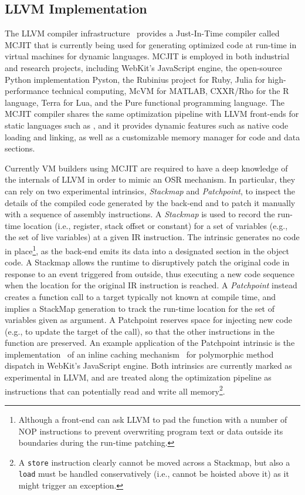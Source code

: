 \subsection{LLVM Implementation}
\label{ss:osrkit-implementation}

The LLVM compiler infrastructure~\cite{Lattner04} provides a Just-In-Time compiler called MCJIT that is currently being used for generating optimized code at run-time in virtual machines for dynamic languages. MCJIT is employed in both industrial and research projects, including WebKit's JavaScript engine, the open-source Python implementation Pyston, the Rubinius project for Ruby, Julia for high-performance technical computing, McVM for MATLAB, CXXR/Rho for the R language, Terra for Lua, and the Pure functional programming language. The MCJIT compiler shares the same optimization pipeline with LLVM front-ends for static languages such as \clang, and it provides dynamic features such as native code loading and linking, as well as a customizable memory manager for code and data sections.

Currently VM builders using MCJIT are required to have a deep knowledge of the internals of LLVM in order to mimic an OSR mechanism. In particular, they can rely on two experimental intrinsics, {\em Stackmap} and {\em Patchpoint}, to inspect the details of the compiled code generated by the back-end and to patch it manually with a sequence of assembly instructions. A {\em Stackmap} is used to record the run-time location (i.e., register, stack offset or constant) for a set of variables (e.g., the set of live variables) at a given IR instruction. The intrinsic generates no code in place\footnote{Although a front-end can ask LLVM to pad the function with a number of NOP instructions to prevent overwriting program text or data outside its boundaries during the run-time patching.}, as the back-end emits its data into a designated section in the object code. A Stackmap allows the runtime to disruptively patch the original code in response to an event triggered from outside, thus executing a new code sequence when the location for the original IR instruction is reached. A {\em Patchpoint} instead creates a function call to a target typically not known at compile time, and implies a StackMap generation to track the run-time location for the set of variables given as argument. A Patchpoint reserves space for injecting new code (e.g., to update the target of the call), so that the other instructions in the function are preserved. An example application of the Patchpoint intrinsic is the implementation~\cite{Pizlo14} of an inline caching mechanism~\cite{Deutsch84} for polymorphic method dispatch in WebKit's JavaScript engine. Both intrinsics are currently marked as experimental in LLVM, and are treated along the optimization pipeline as instructions that can potentially read and write all memory\footnote{A {\tt store} instruction clearly cannot be moved across a Stackmap, but also a {\tt load} must be handled conservatively (i.e., cannot be hoisted above it) as it might trigger an exception.}.

